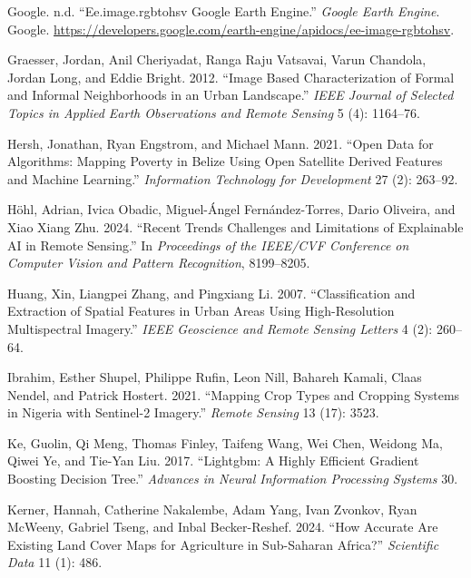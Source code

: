 \documentclass[
]{article}
\newlength{\cslhangindent}
\newlength{\cslentryspacingunit} %
\newenvironment{CSLReferences}[2] %
 {%
  \setlength{\parindent}{0pt}
  \ifodd #1
  \let\oldpar\par
  \def\par{\hangindent=\cslhangindent\oldpar}
  \fi
  \setlength{\parskip}{#2\cslentryspacingunit}
 }%
 {}
\begin{document}
\begin{CSLReferences}{1}{0}
\leavevmode{}%
Google. n.d. {``Ee.image.rgbtohsv Google Earth Engine.''} \emph{Google
Earth Engine}. Google.
\url{https://developers.google.com/earth-engine/apidocs/ee-image-rgbtohsv}.

\leavevmode{}%
Graesser, Jordan, Anil Cheriyadat, Ranga Raju Vatsavai, Varun Chandola,
Jordan Long, and Eddie Bright. 2012. {``Image Based Characterization of
Formal and Informal Neighborhoods in an Urban Landscape.''} \emph{IEEE
Journal of Selected Topics in Applied Earth Observations and Remote
Sensing} 5 (4): 1164--76.

\leavevmode{}%
Hersh, Jonathan, Ryan Engstrom, and Michael Mann. 2021. {``Open Data for
Algorithms: Mapping Poverty in Belize Using Open Satellite Derived
Features and Machine Learning.''} \emph{Information Technology for
Development} 27 (2): 263--92.

\leavevmode{}%
Höhl, Adrian, Ivica Obadic, Miguel-Ángel Fernández-Torres, Dario
Oliveira, and Xiao Xiang Zhu. 2024. {``Recent Trends Challenges and
Limitations of Explainable AI in Remote Sensing.''} In \emph{Proceedings
of the IEEE/CVF Conference on Computer Vision and Pattern Recognition},
8199--8205.

\leavevmode{}%
Huang, Xin, Liangpei Zhang, and Pingxiang Li. 2007. {``Classification
and Extraction of Spatial Features in Urban Areas Using High-Resolution
Multispectral Imagery.''} \emph{IEEE Geoscience and Remote Sensing
Letters} 4 (2): 260--64.

\leavevmode{}%
Ibrahim, Esther Shupel, Philippe Rufin, Leon Nill, Bahareh Kamali, Claas
Nendel, and Patrick Hostert. 2021. {``Mapping Crop Types and Cropping
Systems in Nigeria with Sentinel-2 Imagery.''} \emph{Remote Sensing} 13
(17): 3523.

\leavevmode{}%
Ke, Guolin, Qi Meng, Thomas Finley, Taifeng Wang, Wei Chen, Weidong Ma,
Qiwei Ye, and Tie-Yan Liu. 2017. {``Lightgbm: A Highly Efficient
Gradient Boosting Decision Tree.''} \emph{Advances in Neural Information
Processing Systems} 30.

\leavevmode{}%
Kerner, Hannah, Catherine Nakalembe, Adam Yang, Ivan Zvonkov, Ryan
McWeeny, Gabriel Tseng, and Inbal Becker-Reshef. 2024. {``How Accurate
Are Existing Land Cover Maps for Agriculture in Sub-Saharan Africa?''}
\emph{Scientific Data} 11 (1): 486.


\end{CSLReferences}
\end{document}
